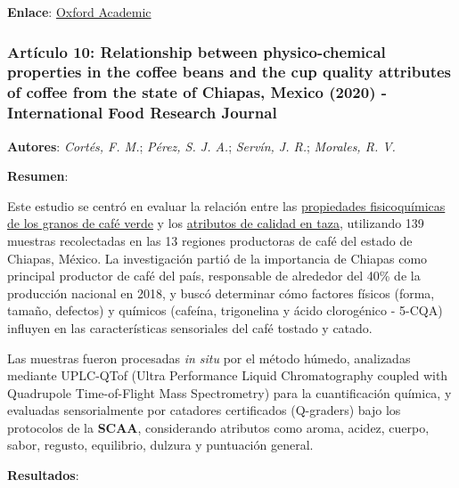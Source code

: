 \documentclass{article}
\begin{document}
\textbf{Enlace}: \href{https://academic.oup.com/ijfst/article/54/11/3008/7805223}{Oxford Academic} \vspace{0.5cm}


\subsubsection{\textbf{Artículo 10:} \textcolor{pakistangreen}{\textbf{Relationship between physico-chemical properties in the coffee beans and the cup quality attributes of coffee from the state of Chiapas, Mexico (2020) - International Food Research Journal }}} \vspace{0.5cm}

\textbf{Autores}: \textit{Cortés, F. M.}; \textit{Pérez, S. J. A.}; \textit{Servín, J. R.}; \textit{Morales, R. V.} \vspace{0.5cm}

\textbf{Resumen}:  \vspace{0.5cm}

Este estudio se centró en evaluar la relación entre las \underline{propiedades fisicoquímicas de los granos de café verde} y los \underline{atributos de calidad en taza}, utilizando 139 muestras recolectadas en las 13 regiones productoras de café del estado de Chiapas, México. La investigación partió de la importancia de Chiapas como principal productor de café del país, responsable de alrededor del 40\% de la producción nacional en 2018, y buscó determinar cómo factores físicos (forma, tamaño, defectos) y químicos (cafeína, trigonelina y ácido clorogénico - 5-CQA) influyen en las características sensoriales del café tostado y catado.  

Las muestras fueron procesadas \textit{in situ} por el método húmedo, analizadas mediante UPLC-QTof (Ultra Performance Liquid Chromatography coupled with Quadrupole Time-of-Flight Mass Spectrometry) para la cuantificación química, y evaluadas sensorialmente por catadores certificados (Q-graders) bajo los protocolos de la \textbf{SCAA}, considerando atributos como aroma, acidez, cuerpo, sabor, regusto, equilibrio, dulzura y puntuación general.  

\textbf{Resultados}: \vspace{0.5cm}  
\end{document}
